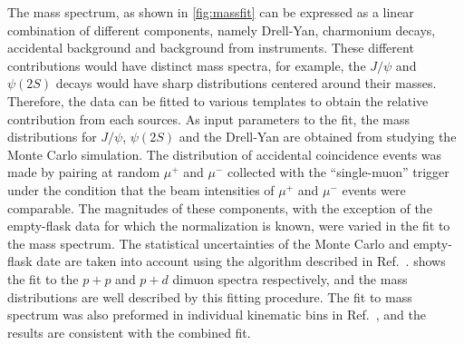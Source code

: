 \documentclass[reprint,aps,unsortedaddress,superscriptaddress,prl,floatfix,showpacs,linenumbers,final]{revtex4-2}
\begin{document}
The mass spectrum, as shown in \cref{fig:massfit} can be expressed as a linear combination of different components,
namely Drell-Yan, charmonium decays, accidental background and background from instruments.
These different contributions would have distinct mass spectra, for example, the $J/\psi$
and $\psi\left(2S\right)$ decays would have sharp distributions centered around their masses.
Therefore, the data can be fitted to various templates to obtain
the relative contribution from each sources. 
As input parameters to the fit, the mass distributions for $J/\psi$, $\psi\left(2S\right)$ 
and the Drell-Yan are obtained from studying the Monte Carlo simulation. %
The distribution of accidental coincidence events was made by pairing at random $\mu^+$ and $\mu^-$ collected with the ``single-muon'' trigger
under the condition that the beam intensities of $\mu^+$ and $\mu^-$ events were comparable.
The magnitudes of these components,
with the exception of the empty-flask data for which the normalization is known,
were varied in the fit to the mass spectrum.
The statistical uncertainties of the Monte Carlo and empty-flask date are taken into account using the algorithm described in Ref.~\cite{barlow1993}.
 shows the fit to the $p+p$ and $p+d$ dimuon spectra respectively,
and the mass distributions are well described by this fitting procedure. 
The fit to mass spectrum was also preformed in individual kinematic bins in Ref.~\cite{leung2024a},
and the results are consistent with the combined fit.
\end{document}
